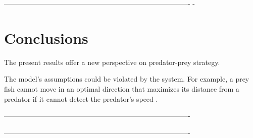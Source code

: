 \documentclass[12pt]{article}
\begin{document}
%
-------------------------------------------------------------------------------
-
\section{Conclusions}

The present results offer a new perspective on predator-prey strategy. 


The model's assumptions could be violated by the system. For example, a prey
fish cannot move in an optimal direction that maximizes its distance from a
predator if it cannot detect the predator's speed \citep{Weihs:1984tb}.

% 
-------------------------------------------------------------------------------

\pagebreak



% 
-------------------------------------------------------------------------------

\end{document}
